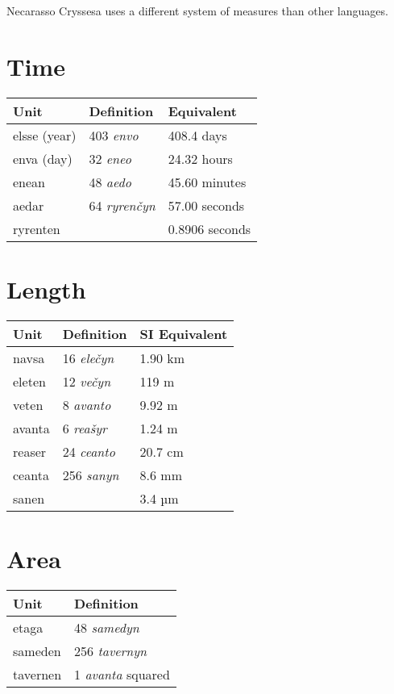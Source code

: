 \documentclass{book}
\begin{document}
Necarasso Cryssesa uses a different system of measures than other languages.

\section{Time}

\begin{table}[H]
  \centering
	\begin{tabular}{|l|l|l|}
		\hline
		Unit & Definition & Equivalent \\ \hline
		elsse (year) & 403 \emph{envo} & 408.4 days \\
		enva (day) & 32 \emph{eneo} & 24.32 hours \\
		enean & 48 \emph{aedo} & 45.60 minutes \\
		aedar & 64 \emph{ryrenčyn} & 57.00 seconds \\
		ryrenten & & 0.8906 seconds \\ \hline
	\end{tabular}
\end{table}

\section{Length}

\begin{table}[H]
  \centering
	\begin{tabular}{|l|l|l|}
		\hline
		Unit & Definition & SI Equivalent \\ \hline
		navsa & 16 \emph{elečyn} & 1.90 km \\
		eleten & 12 \emph{večyn} & 119 m \\
		veten & 8 \emph{avanto} & 9.92 m \\
		avanta & 6 \emph{reašyr} & 1.24 m \\
		reaser & 24 \emph{ceanto} & 20.7 cm \\
		ceanta & 256 \emph{sanyn} & 8.6 mm \\
		sanen & & 3.4 µm \\ \hline
	\end{tabular}
\end{table}

\section{Area}

\begin{table}[H]
  \centering
	\begin{tabular}{|l|l|}
		\hline
		Unit & Definition \\ \hline
		etaga & 48 \emph{samedyn} \\
		sameden & 256 \emph{tavernyn} \\
		tavernen & 1 \emph{avanta} squared \\ \hline
	\end{tabular}
\end{table}
\end{document}
